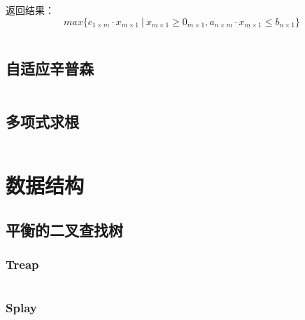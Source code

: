\documentclass[a4paper]{article}
\newcommand{\cppcode}[1]{
    \inputminted[mathescape,
    frame=lines,linenos]{cpp}{source/#1}
}
\begin{document}
返回结果：$$max\{c_{1 \times m} \cdot x_{m \times 1} \ | \ x_{m \times 1} \geq 0_{m \times 1}, a_{n \times m} \cdot x_{m \times 1} \leq b_{n \times 1}\}$$

\cppcode{numerical-algorithm/linear-programming-simplex.cpp}

\subsection{自适应辛普森}

\cppcode{numerical-algorithm/adaptive-simpson.cpp}


\subsection{多项式求根}

\cppcode{numerical-algorithm/polyroot.cpp}




\section{数据结构}

\subsection{平衡的二叉查找树}

\subsubsection{Treap}

\cppcode{data-structure/Treap.cpp}

\subsubsection{Splay}

\cppcode{data-structure/Splay.cpp}
\end{document}
